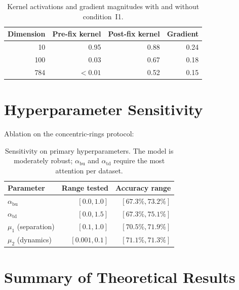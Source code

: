 \documentclass[11pt,a4paper]{article}
\begin{document}
\begin{table}[h]
\centering
\begin{tabular}{rrrr}
\toprule
\textbf{Dimension} & \textbf{Pre-fix kernel} & \textbf{Post-fix kernel} & \textbf{Gradient} \\
\midrule
10  & 0.95    & 0.88 & 0.24 \\
100 & 0.03    & 0.67 & 0.18 \\
784 & $<0.01$ & 0.52 & 0.15 \\
\bottomrule
\end{tabular}
\caption{Kernel activations and gradient magnitudes with and without condition~I1.}
\end{table}

\section{Hyperparameter Sensitivity}

Ablation on the concentric-rings protocol:

\begin{table}[h]
\centering
\begin{tabular}{lrr}
\toprule
\textbf{Parameter} & \textbf{Range tested} & \textbf{Accuracy range} \\
\midrule
$\alpha_{\mathrm{bu}}$ & $[0.0, 1.0]$   & $[67.3\%, 73.2\%]$ \\
$\alpha_{\mathrm{td}}$ & $[0.0, 1.5]$   & $[67.3\%, 75.1\%]$ \\
$\mu_1$ (separation)   & $[0.1, 1.0]$   & $[70.5\%, 71.9\%]$ \\
$\mu_2$ (dynamics)     & $[0.001, 0.1]$ & $[71.1\%, 71.3\%]$ \\
\bottomrule
\end{tabular}
\caption{Sensitivity on primary hyperparameters. The model is moderately robust;
$\alpha_{\mathrm{bu}}$ and $\alpha_{\mathrm{td}}$ require the most attention per dataset.}
\end{table}

\section{Summary of Theoretical Results}
\end{document}
